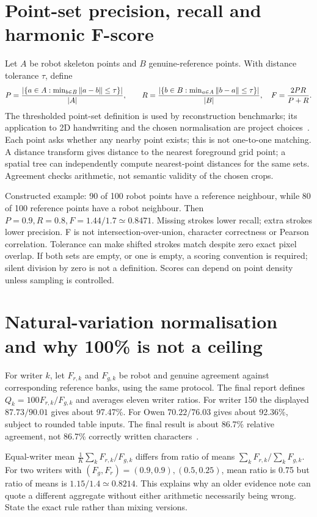 \section{Point-set precision, recall and harmonic F-score}
Let $A$ be robot skeleton points and $B$ genuine-reference points. With
distance tolerance $\tau$, define
\[
P={|\{a\in A:\min_{b\in B}\|a-b\|\le\tau\}|\over|A|},\qquad
R={|\{b\in B:\min_{a\in A}\|b-a\|\le\tau\}|\over|B|},\quad
F={2PR\over P+R}.
\]
The thresholded point-set definition is used by reconstruction benchmarks;
its application to 2D handwriting and the chosen normalisation are project
choices~\cite{tanksmetric}. Each point asks whether any nearby point exists;
this is not one-to-one matching. A distance transform gives distance to the
nearest foreground grid point; a spatial tree can independently compute
nearest-point distances for the same sets. Agreement checks arithmetic,
not semantic validity of the chosen crops.

Constructed example: 90 of 100 robot points have a reference neighbour,
while 80 of 100 reference points have a robot neighbour. Then
$P=0.9,R=0.8,F=1.44/1.7\simeq0.8471$. Missing strokes lower recall;
extra strokes lower precision. F is not intersection-over-union, character
correctness or Pearson correlation. Tolerance can make shifted strokes
match despite zero exact pixel overlap. If both sets are empty, or one is
empty, a scoring convention is required; silent division by zero is not a
definition. Scores can depend on point density unless sampling is controlled.

\section{Natural-variation normalisation and why 100\% is not a ceiling}
For writer $k$, let $F_{r,k}$ and $F_{g,k}$ be robot and genuine agreement
against corresponding reference banks, using the same protocol. The final
report defines $Q_k=100F_{r,k}/F_{g,k}$ and averages eleven writer ratios.
For writer 150 the displayed $87.73/90.01$ gives about 97.47\%.
For Owen $70.22/76.03$ gives about 92.36\%, subject to rounded table inputs.
The final result is about 86.7\% relative agreement, not 86.7\% correctly
written characters~\cite{finalreport2026}.

Equal-writer mean $\frac1K\sum_kF_{r,k}/F_{g,k}$ differs from
ratio of means $\sum_kF_{r,k}/\sum_kF_{g,k}$. For two writers with
$(F_g,F_r)=(0.9,0.9),(0.5,0.25)$, mean ratio is 0.75 but ratio of
means is $1.15/1.4\simeq0.8214$. This explains why an older evidence
note can quote a different aggregate without either arithmetic necessarily
being wrong. State the exact rule rather than mixing versions.

